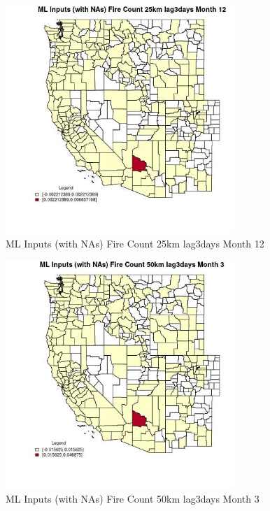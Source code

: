 \begin{figure} 
\centering  
\includegraphics[width=0.77\textwidth]{Code_Outputs/Report_ML_input_PM25_Step4_part_e_de_duplicated_aves_compiled_2019-05-21wNAs_CountyFire_Count_25km_lag3daysmedianMonth12.jpg} 
\caption{\label{fig:Report_ML_input_PM25_Step4_part_e_de_duplicated_aves_compiled_2019-05-21wNAsCountyFire_Count_25km_lag3daysmedianMonth12}ML Inputs (with NAs) Fire Count 25km lag3days Month 12} 
\end{figure} 
 

\begin{figure} 
\centering  
\includegraphics[width=0.77\textwidth]{Code_Outputs/Report_ML_input_PM25_Step4_part_e_de_duplicated_aves_compiled_2019-05-21wNAs_CountyFire_Count_50km_lag3daysmedianMonth3.jpg} 
\caption{\label{fig:Report_ML_input_PM25_Step4_part_e_de_duplicated_aves_compiled_2019-05-21wNAsCountyFire_Count_50km_lag3daysmedianMonth3}ML Inputs (with NAs) Fire Count 50km lag3days Month 3} 
\end{figure} 
 

